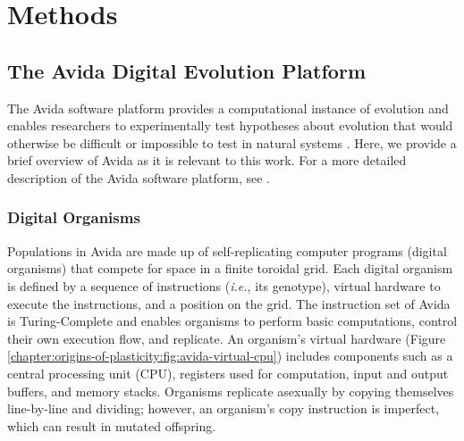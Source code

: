 \section{Methods}
\label{chapter:origins-of-plasticity:sec:methods}

\subsection{The Avida Digital Evolution Platform}
\label{chapter:origins-of-plasticity:sec:methods:avida}

The Avida software platform provides a computational instance of evolution and enables researchers to experimentally test hypotheses about evolution that would otherwise be difficult or impossible to test in natural systems \citep{ofria_avida:_2009}. 
Here, we provide a brief overview of Avida as it is relevant to this work. 
For a more detailed description of the Avida software platform, see \citep{ofria_avida:_2009}.

\subsubsection{Digital Organisms}
\label{chapter:origins-of-plasticity:sec:methods:avida:organisms}

Populations in Avida are made up of self-replicating computer programs (digital organisms) that compete for space in a finite toroidal grid. 
Each digital organism is defined by a sequence of instructions (\textit{i.e.}, its genotype), virtual hardware to execute the instructions, and a position on the grid. 
The instruction set of Avida is Turing-Complete and enables organisms to perform basic computations, control their own execution flow, and replicate. 
An organism's virtual hardware (Figure \ref{chapter:origins-of-plasticity:fig:avida-virtual-cpu}) includes components such as a central processing unit (CPU), registers used for computation, input and output buffers, and memory stacks. 
Organisms replicate asexually by copying themselves line-by-line and dividing; however, an organism's copy instruction is imperfect, which can result in mutated offspring.



